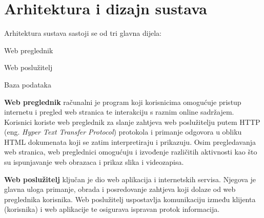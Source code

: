 \chapter{Arhitektura i dizajn sustava}

		


		\noindent Arhitektura sustava sastoji se od tri glavna dijela: 
		
		\begin{packed_item}
			\item Web preglednik 
			\item Web poslužitelj
			\item Baza podataka
		\end{packed_item}
		
		\textbf{Web preglednik} računalni je program koji korisnicima omogućuje  pristup internetu i pregled web stranica te interakciju s raznim online sadržajem. Korisnici koriste web preglednik za slanje zahtjeva web poslužitelju putem HTTP (eng. \textit{Hyper Text Transfer Protocol}) protokola i primanje odgovora u obliku HTML dokumenata koji se zatim interpretiraju i prikazuju. Osim pregledavanja web stranica, web preglednici omogućuju i izvođenje različitih aktivnosti kao što su ispunjavanje web obrazaca i prikaz slika i videozapisa.
		
		\textbf{Web poslužitelj} ključan je dio web aplikacija i internetskih servisa. Njegova je glavna uloga primanje, obrada i posredovanje zahtjeva koji dolaze od web preglednika korisnika. Web poslužitelj uspostavlja komunikaciju između klijenta (korisnika) i web aplikacije te osigurava ispravan protok informacija.
		
